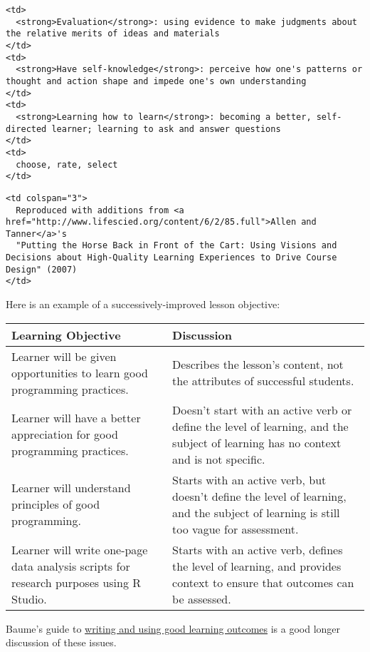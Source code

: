 \begin{verbatim}
<td>
  <strong>Evaluation</strong>: using evidence to make judgments about the relative merits of ideas and materials
</td>
<td>
  <strong>Have self-knowledge</strong>: perceive how one's patterns or thought and action shape and impede one's own understanding
</td>
<td>
  <strong>Learning how to learn</strong>: becoming a better, self-directed learner; learning to ask and answer questions
</td>
<td>
  choose, rate, select
</td>
\end{verbatim}

\begin{verbatim}
<td colspan="3">
  Reproduced with additions from <a href="http://www.lifescied.org/content/6/2/85.full">Allen and Tanner</a>'s
  "Putting the Horse Back in Front of the Cart: Using Visions and Decisions about High-Quality Learning Experiences to Drive Course Design" (2007)
</td>
\end{verbatim}

Here is an example of a successively-improved lesson objective:

\begin{longtable}[c]{@{}ll@{}}
\toprule
Learning Objective & Discussion\tabularnewline
\midrule
\endhead
Learner will be given opportunities to learn good programming practices.
& Describes the lesson's content, not the attributes of successful
students.\tabularnewline
Learner will have a better appreciation for good programming practices.
& Doesn't start with an active verb or define the level of learning, and
the subject of learning has no context and is not
specific.\tabularnewline
Learner will understand principles of good programming. & Starts with an
active verb, but doesn't define the level of learning, and the subject
of learning is still too vague for assessment.\tabularnewline
Learner will write one-page data analysis scripts for research purposes
using R Studio. & Starts with an active verb, defines the level of
learning, and provides context to ensure that outcomes can be
assessed.\tabularnewline
\bottomrule
\end{longtable}

Baume's guide to
\href{\{\{\%20page.root\%20\}\}/files/papers/baume-learning-outcomes-2009.pdf}{writing
and using good learning outcomes} is a good longer discussion of these
issues.

